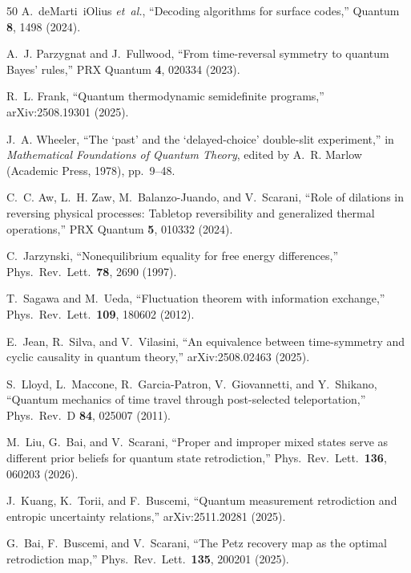\documentclass[12pt]{article}
\theoremstyle{definition}
\theoremstyle{remark}
\begin{document}
\begin{thebibliography}{50}
A.~deMarti~iOlius \emph{et~al.},
``Decoding algorithms for surface codes,''
Quantum \textbf{8}, 1498 (2024).

A.~J. Parzygnat and J.~Fullwood,
``From time-reversal symmetry to quantum Bayes' rules,''
PRX Quantum \textbf{4}, 020334 (2023).

R.~L. Frank,
``Quantum thermodynamic semidefinite programs,''
arXiv:2508.19301 (2025).

J.~A. Wheeler,
``The `past' and the `delayed-choice' double-slit experiment,''
in \emph{Mathematical Foundations of Quantum Theory},
edited by A.~R. Marlow (Academic Press, 1978), pp.~9--48.

C.~C. Aw, L.~H. Zaw, M.~Balanzo-Juando, and V.~Scarani,
``Role of dilations in reversing physical processes: Tabletop
reversibility and generalized thermal operations,''
PRX Quantum \textbf{5}, 010332 (2024).

C.~Jarzynski,
``Nonequilibrium equality for free energy differences,''
Phys.\ Rev.\ Lett.\ \textbf{78}, 2690 (1997).

T.~Sagawa and M.~Ueda,
``Fluctuation theorem with information exchange,''
Phys.\ Rev.\ Lett.\ \textbf{109}, 180602 (2012).

E.~Jean, R.~Silva, and V.~Vilasini,
``An equivalence between time-symmetry and cyclic causality in
quantum theory,''
arXiv:2508.02463 (2025).

S.~Lloyd, L.~Maccone, R.~Garcia-Patron, V.~Giovannetti, and
Y.~Shikano,
``Quantum mechanics of time travel through post-selected
teleportation,''
Phys.\ Rev.\ D \textbf{84}, 025007 (2011).

M.~Liu, G.~Bai, and V.~Scarani,
``Proper and improper mixed states serve as different prior beliefs
for quantum state retrodiction,''
Phys.\ Rev.\ Lett.\ \textbf{136}, 060203 (2026).

J.~Kuang, K.~Torii, and F.~Buscemi,
``Quantum measurement retrodiction and entropic uncertainty
relations,''
arXiv:2511.20281 (2025).

G.~Bai, F.~Buscemi, and V.~Scarani,
``The Petz recovery map as the optimal retrodiction map,''
Phys.\ Rev.\ Lett.\ \textbf{135}, 200201 (2025).

\end{thebibliography}
\end{document}
